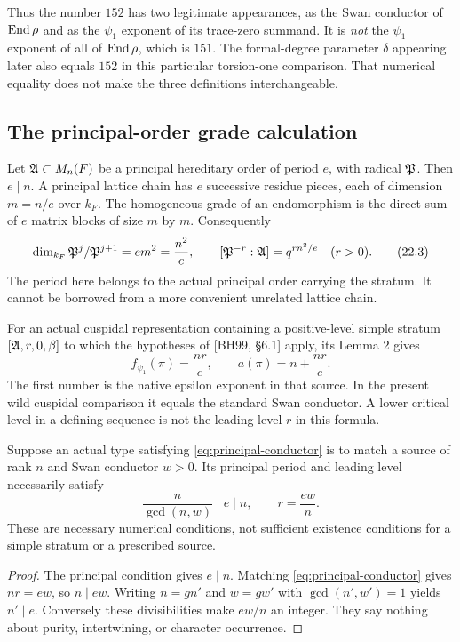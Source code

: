Thus the number $152$ has two legitimate appearances, as the Swan conductor of $\operatorname{End}\rho$ and as the $\psi_1$ exponent of its trace-zero summand. It is \emph{not} the $\psi_1$ exponent of all of $\operatorname{End}\rho$, which is $151$. The formal-degree parameter $\delta$ appearing later also equals $152$ in this particular torsion-one comparison. That numerical equality does not make the three definitions interchangeable.


\subsection{The principal-order grade calculation}
Let $\mathfrak A\subset M_n(F)$ be a principal hereditary order of period $e$, with radical $\mathfrak P$. Then $e\mid n$. A principal lattice chain has $e$ successive residue pieces, each of dimension $m=n/e$ over $k_F$. The homogeneous grade of an endomorphism is the direct sum of $e$ matrix blocks of size $m$ by $m$. Consequently
\[
 \dim_{k_F}\mathfrak P^j/\mathfrak P^{j+1}=e m^2=\frac{n^2}{e},
 \qquad [\mathfrak P^{-r}:\mathfrak A]=q^{r n^2/e} \quad(r>0).
 \tag{22.3}\label{eq:grade}
\]
The period here belongs to the actual principal order carrying the stratum. It cannot be borrowed from a more convenient unrelated lattice chain.

For an actual cuspidal representation containing a positive-level simple stratum $[\mathfrak A,r,0,\beta]$ to which the hypotheses of [BH99, \S6.1] apply, its Lemma 2 gives
\[
 f_{\psi_1}(\pi)=\frac{nr}{e},\qquad
 a(\pi)=n+\frac{nr}{e}.
 \tag{22.4}\label{eq:principal-conductor}
\]
The first number is the native epsilon exponent in that source. In the present wild cuspidal comparison it equals the standard Swan conductor. A lower critical level in a defining sequence is not the leading level $r$ in this formula.

\begin{proposition}\label{prop:period}
Suppose an actual type satisfying \eqref{eq:principal-conductor} is to match a source of rank $n$ and Swan conductor $w>0$. Its principal period and leading level necessarily satisfy
\[
 \frac{n}{\gcd(n,w)}\mid e\mid n,
 \qquad r=\frac{ew}{n}.
 \tag{22.5}\label{eq:period}
\]
These are necessary numerical conditions, not sufficient existence conditions for a simple stratum or a prescribed source.
\end{proposition}
\begin{proof}
The principal condition gives $e\mid n$. Matching \eqref{eq:principal-conductor} gives $nr=ew$, so $n\mid ew$. Writing $n=gn'$ and $w=gw'$ with $\gcd(n',w')=1$ yields $n'\mid e$. Conversely these divisibilities make $ew/n$ an integer. They say nothing about purity, intertwining, or character occurrence.
\end{proof}

